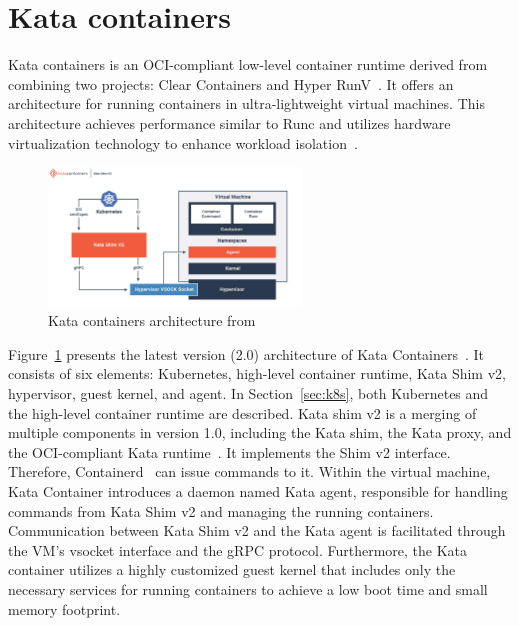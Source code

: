 \section{Kata containers}
\label{sec:Kata}

Kata containers is an OCI-compliant low-level container runtime derived from combining two projects: Clear Containers and Hyper RunV~\cite*{Kata-Containers}. It offers an architecture for running containers in ultra-lightweight virtual machines. This architecture achieves performance similar to Runc and 
utilizes hardware virtualization technology to enhance workload isolation~\cite*{9198653}.
\begin{figure}[htp]
  \centering
  \includegraphics[width=0.6\textwidth]{images/kata.PNG}
  \caption[Kata containers architecture]{Kata containers architecture from~\cite*{Kata-Containers} }
  \label{fig:kata}
\end{figure}
Figure~\ref{fig:kata} presents the latest version (2.0) architecture of Kata Containers~\cite*{Kata_arch}. It consists of six elements: Kubernetes, high-level container runtime, Kata Shim v2, hypervisor, guest kernel, and agent. In Section~\ref{sec:k8s}, both Kubernetes and the high-level container 
runtime are described. Kata shim v2 is a merging of multiple components in version 1.0, including the Kata shim, the Kata proxy, and the OCI-compliant Kata runtime~\cite*{Kata_arch}. It implements the Shim v2 interface. Therefore, Containerd~\cite*{containerd} can issue commands to it. Within the 
virtual machine, Kata Container introduces a daemon named Kata agent, responsible for handling commands from Kata Shim v2 and managing the running containers. Communication between Kata Shim v2 and the Kata agent is facilitated through the VM's vsocket interface and the gRPC protocol. Furthermore, the 
Kata container utilizes a highly customized guest kernel that includes only the necessary services for running containers to achieve a low boot time and small memory footprint.


